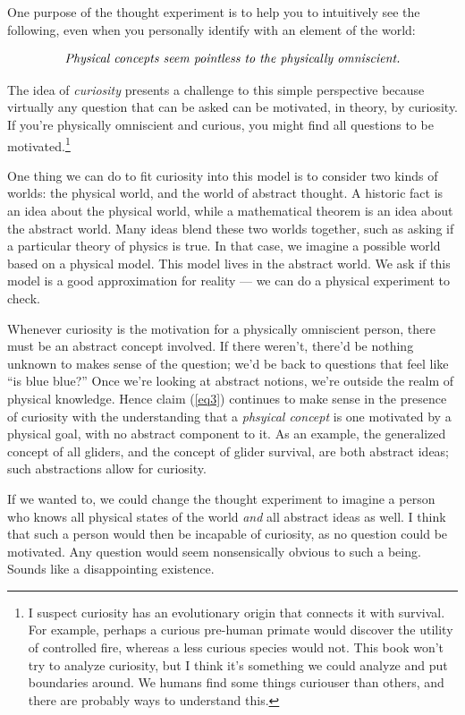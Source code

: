 \documentclass[9pt, twoside]{book}
\theoremstyle{argtstyle}
\begin{document}
One purpose of the thought experiment is to help you to intuitively
see the following, even when you personally identify with an
element of the world:

\begin{equation}\label{eq3}
    \text{\em Physical concepts seem pointless to the physically omniscient.}
\end{equation}

The idea of {\em curiosity} presents a challenge to
this simple perspective because
virtually any question that can be asked can be motivated, in theory, by
curiosity. If you're physically omniscient and curious, you might find all
questions to be motivated.\footnote{I suspect curiosity has an evolutionary
origin that connects it with survival. For example, perhaps a curious pre-human
primate would discover the utility of controlled fire, whereas a less curious
species would not. This book won't try to analyze curiosity, but I think it's
something we could analyze and put boundaries around. We humans find some things
curiouser than others, and there are probably ways to understand this.}

One thing we can do to fit curiosity into this model is to consider two kinds
of worlds: the physical world, and the world of abstract thought.
A historic fact is an idea about the physical world, while a mathematical
theorem is an idea about the abstract world.
Many ideas blend these two worlds together, such as asking if a particular
theory of physics is true. In that case, we imagine a possible world based on a
physical model. This model lives in the abstract world. We ask if this model
is a good approximation for reality ---
we can do a physical experiment to check.

Whenever curiosity is the motivation for a physically omniscient person, there
must be an abstract concept involved. If there weren't, there'd be
nothing unknown to makes sense of the question; we'd be back to questions
that feel like
``is blue blue?''
Once we're looking at abstract
notions, we're outside the realm of physical knowledge.
Hence claim (\ref{eq3}) continues to make sense in
the presence of curiosity with the understanding that a
{\em phsyical concept} is one motivated by a physical goal, with
no abstract component to it.
As an example,
the generalized
concept of all gliders, and the concept of glider survival, are both
abstract ideas; such abstractions allow for curiosity.

If we wanted to, we could change the thought experiment to imagine a person who
knows all physical states of the world {\em and} all abstract ideas as well. I
think that such a person would then be incapable of curiosity, as no question
could be motivated. Any question would seem nonsensically obvious
to such a being. Sounds like a disappointing existence.
\end{document}

